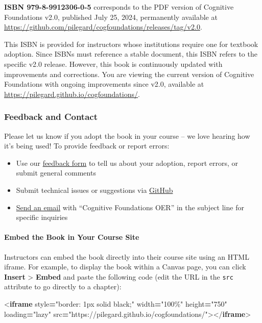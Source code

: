 \documentclass[
]{krantz}
\newenvironment{Shaded}{\begin{snugshade}}{\end{snugshade}}
\newcommand{\DataTypeTok}[1]{\textcolor[rgb]{0.13,0.29,0.53}{#1}}
\newcommand{\KeywordTok}[1]{\textcolor[rgb]{0.13,0.29,0.53}{\textbf{#1}}}
\newcommand{\OperatorTok}[1]{\textcolor[rgb]{0.81,0.36,0.00}{\textbf{#1}}}
\newcommand{\OtherTok}[1]{\textcolor[rgb]{0.56,0.35,0.01}{#1}}
\newcommand{\StringTok}[1]{\textcolor[rgb]{0.31,0.60,0.02}{#1}}
\providecommand{\tightlist}{%
  \setlength{\itemsep}{0pt}\setlength{\parskip}{0pt}}
\begin{document}
\textbf{ISBN 979-8-9912306-0-5} corresponds to the PDF version of Cognitive Foundations v2.0, published July 25, 2024, permanently available at \url{https://github.com/pilegard/cogfoundations/releases/tag/v2.0}.

This ISBN is provided for instructors whose institutions require one for textbook adoption. Since ISBNs must reference a stable document, this ISBN refers to the specific v2.0 release. However, this book is continuously updated with improvements and corrections. You are viewing the current version of Cognitive Foundations with ongoing improvements since v2.0, available at \url{https://pilegard.github.io/cogfoundations/}.

\subsubsection*{Feedback and Contact}\label{feedback-and-contact}


Please let us know if you adopt the book in your course -- we love hearing how it's being used! To provide feedback or report errors:

\begin{itemize}
\tightlist
\item
  Use our \href{https://forms.gle/83CBvAgLuJshRfz37}{feedback form} to tell us about your adoption, report errors, or submit general comments
\item
  Submit technical issues or suggestions via \href{https://github.com/pilegard/cogfoundations}{GitHub}
\item
  \href{mailto:pilegard@ucsd.edu}{Send an email} with ``Cognitive Foundations OER'' in the subject line for specific inquiries
\end{itemize}

\paragraph*{Embed the Book in Your Course Site}\label{embed-the-book-in-your-course-site}

Instructors can embed the book directly into their course site using an HTML iframe. For example, to display the book within a Canvas page, you can click \textbf{Insert} \textgreater{} \textbf{Embed} and paste the following code (edit the URL in the \texttt{src} attribute to go directly to a chapter):

\begin{Shaded}
\begin{Highlighting}[]
\DataTypeTok{\textless{}}\KeywordTok{iframe}
\OtherTok{  style}\OperatorTok{=}\StringTok{"border: 1px solid black;"}\OtherTok{ width}\OperatorTok{=}\StringTok{"100\%"}\OtherTok{ height}\OperatorTok{=}\StringTok{"750"}\OtherTok{ loading}\OperatorTok{=}\StringTok{"lazy"}
\OtherTok{  src}\OperatorTok{=}\StringTok{"https://pilegard.github.io/cogfoundations/"}\DataTypeTok{\textgreater{}\textless{}/}\KeywordTok{iframe}\DataTypeTok{\textgreater{}}
\end{Highlighting}
\end{Shaded}
\end{document}
